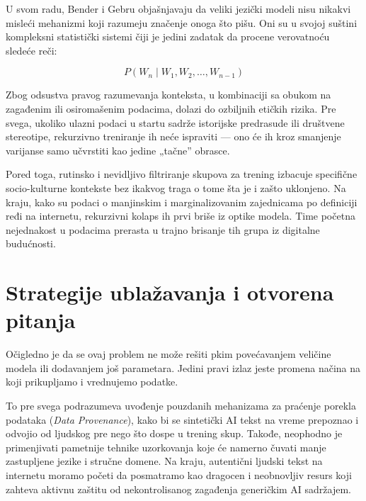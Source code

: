 \documentclass[12pt]{article}
\begin{document}
	U svom radu, Bender i Gebru objašnjavaju da veliki jezički modeli nisu nikakvi misleći mehanizmi koji razumeju značenje onoga što pišu. Oni su u svojoj suštini kompleksni statistički sistemi čiji je jedini zadatak da procene verovatnoću sledeće reči:
	
	$$P(W_n \mid W_1, W_2, \dots, W_{n-1})$$
	
	Zbog odsustva pravog razumevanja konteksta, u kombinaciji sa obukom na zagađenim ili osiromašenim podacima, dolazi do ozbiljnih etičkih rizika. Pre svega, ukoliko ulazni podaci u startu sadrže istorijske predrasude ili društvene stereotipe, rekurzivno treniranje ih neće ispraviti — ono će ih kroz smanjenje varijanse samo učvrstiti kao jedine „tačne” obrasce. 
	
	Pored toga, rutinsko i nevidljivo filtriranje skupova za trening izbacuje specifične socio-kulturne kontekste bez ikakvog traga o tome šta je i zašto uklonjeno. Na kraju, kako su podaci o manjinskim i marginalizovanim zajednicama po definiciji ređi na internetu, rekurzivni kolaps ih prvi briše iz optike modela. Time početna nejednakost u podacima prerasta u trajno brisanje tih grupa iz digitalne budućnosti.
	
	\section{Strategije ublažavanja i otvorena pitanja}
	
	Očigledno je da se ovaj problem ne može rešiti pkim povećavanjem veličine modela ili dodavanjem još parametara. Jedini pravi izlaz jeste promena načina na koji prikupljamo i vrednujemo podatke. 
	
	To pre svega podrazumeva uvođenje pouzdanih mehanizama za praćenje porekla podataka (\textit{Data Provenance}), kako bi se sintetički AI tekst na vreme prepoznao i odvojio od ljudskog pre nego što dospe u trening skup. Takođe, neophodno je primenjivati pametnije tehnike uzorkovanja koje će namerno čuvati manje zastupljene jezike i stručne domene. Na kraju, autentični ljudski tekst na internetu moramo početi da posmatramo kao dragocen i neobnovljiv resurs koji zahteva aktivnu zaštitu od nekontrolisanog zagađenja generičkim AI sadržajem.
	
\end{document}
